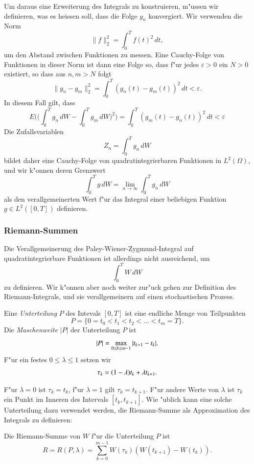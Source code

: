 Um daraus eine Erweiterung des Integrals zu konstruieren, m"ussen wir 
definieren, was es heissen soll, dass die Folge $g_n$ konvergiert.
Wir verwenden die Norm
\[
\|f\|_2^2=\int_0^T f(t)^2 \,dt,
\]
um den Abstand zwischen Funktionen zu messen.
Eine Cauchy-Folge von Funktionen in dieser Norm ist dann eine Folge so,
dass f"ur jedes $\varepsilon>0$ ein $N>0$ existiert, so dass aus
$n,m>N$ folgt
\[
\|g_n-g_m\|_2^2=\int_0^T (g_n(t)-g_m(t))^2\,dt<\varepsilon.
\]
In diesem Fall gilt, dass
\[
E\biggl(
\biggl(
\int_0^T g_n\,dW
-
\int_0^T g_m\,dW
\biggr)^2
\biggr)
=
\int_0^T(g_m(t)-g_n(t))^2\,dt<\varepsilon
\]
Die Zufallsvariablen
\[
Z_n = \int_0^T g_n\,dW
\]
bildet daher eine Cauchy-Folge von quadratintegrierbaren Funktionen
in $L^2(\Omega)$, und wir k"onnen deren Grenzwert
\[
\int_0^T g\,dW
=
\lim_{n\to\infty}\int_0^T g_n\,dW
\]
als den verallgemeinerten Wert f"ur das Integral einer beliebigen Funktion
$g\in L^2([0,T])$ definieren.

\subsubsection{Riemann-Summen}
Die Verallgemeinerung des Paley-Wiener-Zygmund-Integral auf
quadratintegrierbare Funktionen ist allerdings nicht ausreichend, um
\[
\int_0^T W\,dW
\]
zu definieren.
Wir k"onnen aber noch weiter zur"uck gehen zur Definition des
Riemann-Integrals, und sie verallgemeinern auf einen stochastischen
Prozess.

\begin{definition}
Eine {\em Unterteilung} $P$ des Intevals $[0,T]$ ist eine endliche Menge
von Teilpunkten
\[
P=\{ 0=t_0<t_1<t_2<\dots<t_m=T\}.
\]
Die {\em Maschenweite} $|P|$ der Unterteilung $P$ ist
\[
|P|=\max_{0\le k\le m-1}|t_{k+1\mathstrut}-t_{k\mathstrut}|.
\]
F"ur ein festes $0\le \lambda\le 1$ setzen wir
\[
\tau_k = (1-\lambda)t_{k\mathstrut}+\lambda t_{k+1\mathstrut}.
\]
\end{definition}
F"ur $\lambda=0$ ist $\tau_k=t_k$, f"ur $\lambda=1$ gilt $\tau_k=t_{k+1}$.
F"ur andere Werte von $\lambda$ ist $\tau_k$ ein Punkt im Inneren des
Intervals $[t_k,t_{k+1}]$.
Wie "ublich kann eine solche Unterteilung dazu verwendet werden, die 
Riemann-Summe als Approximation des Integrals zu definieren:

\begin{definition}
Die Riemann-Summe von $W$ f"ur die Unterteilung $P$ ist
\[
R=R(P,\lambda) = \sum_{k=0}^{m-1} W(\tau_k)(W(t_{k+1})-W(t_k)).
\]
\end{definition}

